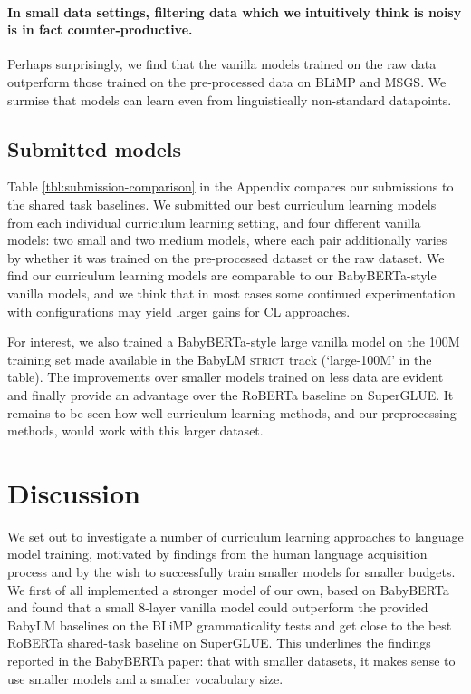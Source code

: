 \paragraph{In small data settings, filtering data which we intuitively think is noisy is in fact counter-productive.} Perhaps surprisingly, we find that the vanilla models trained on the raw data outperform those trained on the pre-processed data on BLiMP and MSGS. We surmise that models can learn even from linguistically non-standard datapoints.

\subsection{Submitted models}

Table \ref{tbl:submission-comparison} in the Appendix compares our submissions to the shared task baselines. We submitted our best curriculum learning models from each individual curriculum learning setting, and four different vanilla models: two small and two medium models, where each pair additionally varies by whether it was trained on the pre-processed dataset or the raw dataset.
We find our curriculum learning models are comparable to our BabyBERTa-style vanilla models, and we think that in most cases some continued experimentation with configurations may yield larger gains for CL approaches.


For interest, we also trained a BabyBERTa-style large vanilla model on the 100M training set made available in the BabyLM \textsc{strict} track (`large-100M' in the table). The improvements over smaller models trained on less data are evident and finally provide an advantage over the RoBERTa baseline on SuperGLUE. It remains to be seen how well curriculum learning methods, and our preprocessing methods, would work with this larger dataset.

\vspace{-1mm}

\section{Discussion}\label{sec:discussion}

We set out to investigate a number of curriculum learning approaches to language model training, motivated by findings from the human language acquisition process and by the wish to successfully train smaller models for smaller budgets.
We first of all implemented a stronger model of our own, based on BabyBERTa \cite{huebner2021babyberta} and found that a small 8-layer vanilla model could outperform the provided BabyLM baselines on the BLiMP grammaticality tests and get close to the best RoBERTa shared-task baseline on SuperGLUE. This underlines the findings reported in the BabyBERTa paper: that with smaller datasets, it makes sense to use smaller models and a smaller vocabulary size.

